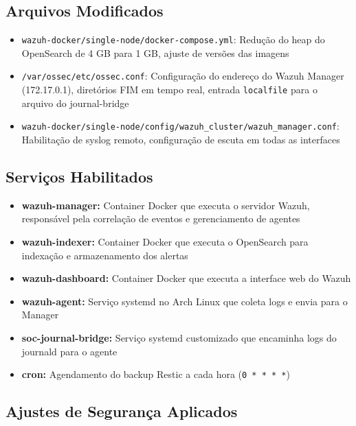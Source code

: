 \documentclass[12pt,a4paper]{article}
\begin{document}
    \subsection{Arquivos Modificados}

    \begin{itemize}
        \item \texttt{wazuh-docker/single-node/docker-compose.yml}: Redução do heap do OpenSearch de 4 GB para 1 GB, ajuste de versões das imagens
        \item \texttt{/var/ossec/etc/ossec.conf}: Configuração do endereço do Wazuh Manager (172.17.0.1), diretórios FIM em tempo real, entrada \texttt{localfile} para o arquivo do journal-bridge
        \item \texttt{wazuh-docker/single-node/config/wazuh\_cluster/wazuh\_manager.conf}: Habilitação de syslog remoto, configuração de escuta em todas as interfaces
    \end{itemize}

    \subsection{Serviços Habilitados}

    \begin{itemize}
        \item \textbf{wazuh-manager:} Container Docker que executa o servidor Wazuh, responsável pela correlação de eventos e gerenciamento de agentes
        \item \textbf{wazuh-indexer:} Container Docker que executa o OpenSearch para indexação e armazenamento dos alertas
        \item \textbf{wazuh-dashboard:} Container Docker que executa a interface web do Wazuh
        \item \textbf{wazuh-agent:} Serviço systemd no Arch Linux que coleta logs e envia para o Manager
        \item \textbf{soc-journal-bridge:} Serviço systemd customizado que encaminha logs do journald para o agente
        \item \textbf{cron:} Agendamento do backup Restic a cada hora (\texttt{0 * * * *})
    \end{itemize}

    \subsection{Ajustes de Segurança Aplicados}
\end{document}
